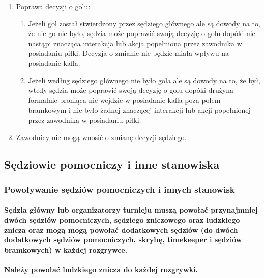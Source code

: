 \documentclass[12pt]{article}
\begin{document}
\begin{enumerate}
	\item
	      Poprawa decyzji o golu:

	      \begin{enumerate}
		      \item
		            Jeżeli gol został stwierdzony przez sędziego głównego ale są dowody
		            na to, że nie go nie było, sędzia może poprawić swoją decyzję o golu
		            dopóki nie nastąpi znacząca interakcja lub akcja popełniona przez
		            zawodnika w posiadaniu piłki. Decyzja o zmianie nie będzie miała
		            wpływu na posiadanie kafla.
		      \item
		            Jeżeli według sędziego głównego nie było gola ale są dowody na to,
		            że był, wtedy sędzia może poprawić swoją decyzję o golu dopóki
		            drużyna formalnie broniąca nie wejdzie w posiadanie kafla poza polem
		            bramkowym i nie było żadnej znaczącej interakcji lub akcji
		            popełnionej przez zawodnika w posiadaniu piłki.
	      \end{enumerate}
	\item
	      Zawodnicy nie mogą wnosić o zmianę decyzji sędziego.
\end{enumerate}

\subsection{Sędziowie pomocniczy i inne stanowiska}

\subsubsection{Powoływanie sędziów pomocniczych i innych stanowisk}

\paragraph{Sędzia główny lub organizatorzy turnieju muszą powołać
	przynajmniej dwóch sędziów pomocniczych, sędziego zniczowego oraz
	ludzkiego znicza oraz mogą mogą powołać dodatkowych sędziów (do dwóch
	dodatkowych sędziów pomocniczych, skrybę, timekeeper i sędziów
	bramkowych) w każdej rozgrywce.}

\paragraph{Należy powołać ludzkiego znicza do każdej rozgrywki.}
\end{document}

